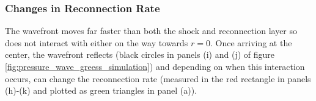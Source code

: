 \subsubsection{Changes in Reconnection Rate}

The wavefront moves far faster than both the shock and reconnection layer so does not interact with either on the way towards $r = 0$. Once arriving at the center, the wavefront reflects (black circles in panels (i) and (j) of figure \ref{fig:pressure_wave_greess_simulation}) and depending on when this interaction occurs, can change the reconnection rate (measured in the red rectangle in panels (h)-(k) and plotted as green triangles in panel (a)).







